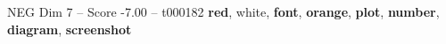 \begin{textsample}{NEG Dim 7 – Score -7.00 – t000182}  \label{ex:f7_neg_034}
\textbf{red}, white, \textbf{font}, \textbf{orange}, \textbf{plot}, \textbf{number}, \textbf{diagram}, \textbf{screenshot}

\end{textsample}
